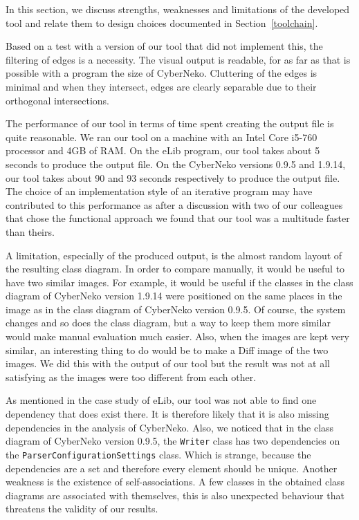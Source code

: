 In this section, we discuss strengths, weaknesses and limitations of the developed tool and relate them to design choices documented in Section~\ref{toolchain}. 

Based on a test with a version of our tool that did not implement this, the filtering of edges is a necessity.
The visual output is readable, for as far as that is possible with a program the size of CyberNeko.
Cluttering of the edges is minimal and when they intersect, edges are clearly separable due to their orthogonal intersections.

The performance of our tool in terms of time spent creating the output file is quite reasonable.
We ran our tool on a machine with an Intel Core i5-760 processor and 4GB of RAM.
On the eLib program, our tool takes about 5 seconds to produce the output file.
On the CyberNeko versions 0.9.5 and 1.9.14, our tool takes about 90 and 93 seconds respectively to produce the output file.
The choice of an implementation style of an iterative program may have contributed to this performance as after a discussion with two of our colleagues that chose the functional approach we found that our tool was a multitude faster than theirs.

A limitation, especially of the produced output, is the almost random layout of the resulting class diagram.
In order to compare manually, it would be useful to have two similar images.
For example, it would be useful if the classes in the class diagram of CyberNeko version 1.9.14 were positioned on the same places in the image as in the class diagram of CyberNeko version 0.9.5. 
Of course, the system changes and so does the class diagram, but a way to keep them more similar would make manual evaluation much easier. 
Also, when the images are kept very similar, an interesting thing to do would be to make a Diff image of the two images.
We did this with the output of our tool but the result was not at all satisfying as the images were too different from each other.

As mentioned in the case study of eLib, our tool was not able to find one dependency that does exist there.
It is therefore likely that it is also missing dependencies in the analysis of CyberNeko.
Also, we noticed that in the class diagram of CyberNeko version 0.9.5, the \texttt{Writer} class has two dependencies on the \texttt{ParserConfigurationSettings} class.
Which is strange, because the dependencies are a set and therefore every element should be unique. 
Another weakness is the existence of self-associations. A few classes in the obtained class diagrams are associated with themselves, this is also unexpected behaviour that threatens the validity of our results.